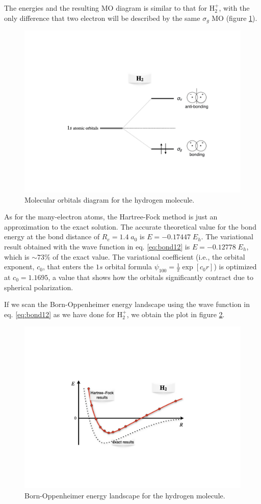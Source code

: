 \documentclass[
  9pt,
]{extbook}
\theoremstyle{definition}
\theoremstyle{definition}
\theoremstyle{definition}
\theoremstyle{remark}
\begin{document}
The energies and the resulting MO diagram is similar to that for \(\mathrm{H}_2^+\), with the only difference that two electron will be described by the same \(\sigma_g\) MO (figure \ref{fig:Fig5c12}).

\begin{figure}

{\centering \includegraphics[width=0.7\linewidth]{./img/OEP_figure5} 

}

\caption{Molecular orbitals diagram for the hydrogen molecule.}\label{fig:Fig5c12}
\end{figure}

As for the many-electron atoms, the Hartree-Fock method is just an approximation to the exact solution. The accurate theoretical value for the bond energy at the bond distance of \(R_e=1.4\;a_0\) is \(E= -0.17447\;E_h\). The variational result obtained with the wave function in eq. \eqref{eq:bond12} is \(E= -0.12778\;E_h\), which is \(\sim 73 \%\) of the exact value. The variational coefficient (i.e., the orbital exponent, \(c_0\), that enters the \(1s\) orbital formula \(\psi_{100}=\frac{1}{\pi}\exp[c_0r]\)) is optimized at \(c_0=1.1695\), a value that shows how the orbitals significantly contract due to spherical polarization.

If we scan the Born-Oppenheimer energy landscape using the wave function in eq. \eqref{eq:bond12} as we have done for \(\mathrm{H}_2^+\), we obtain the plot in figure \ref{fig:Fig6c12}.

\begin{figure}

{\centering \includegraphics[width=0.7\linewidth]{./img/OEP_figure6} 

}

\caption{Born-Oppenheimer energy landscape for the hydrogen molecule.}\label{fig:Fig6c12}
\end{figure}
\end{document}
